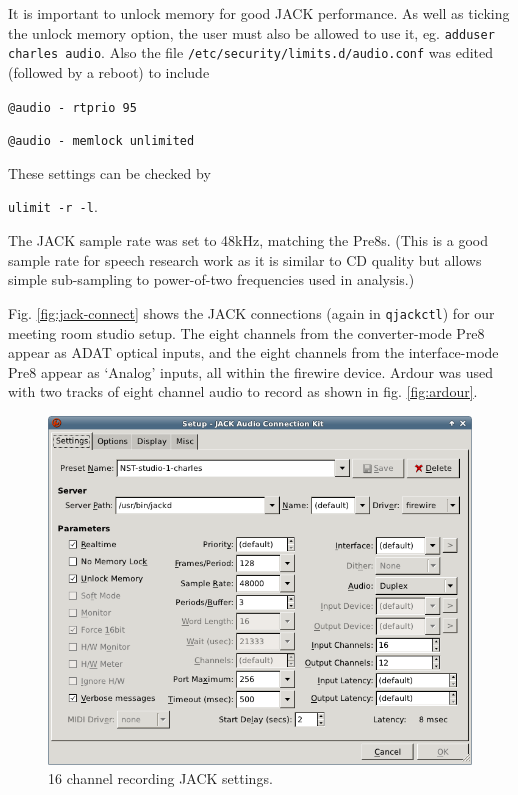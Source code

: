 \documentclass[oneside,english]{scrbook}
\begin{document}
It is important to unlock memory for good JACK performance.  As well as ticking the unlock memory option, the user must also be allowed to use it, eg. {\tt adduser charles audio}.  Also the file {\tt /etc/security/limits.d/audio.conf} was edited (followed by a reboot) to include

{\tt @audio - rtprio 95 }

{\tt @audio - memlock unlimited }

These settings can be checked by

{\tt ulimit -r -l}.

The JACK sample rate was set to 48kHz, matching the Pre8s.  (This is a good sample rate for speech research work as it is similar to CD quality but allows simple sub-sampling to power-of-two frequencies used in analysis.)

Fig. \ref{fig:jack-connect} shows the JACK connections (again in {\tt qjackctl}) for our meeting room studio setup.  The eight channels from the converter-mode Pre8 appear as ADAT optical inputs, and the eight channels from the interface-mode Pre8 appear as `Analog' inputs, all within the firewire device.  Ardour was used with two tracks of eight channel audio to record as shown in fig. \ref{fig:ardour}.



\begin{figure}
  \centering
  \includegraphics[width=\columnwidth]{figs/jack-settings.png}
  \caption{16 channel recording JACK settings.}
  \label{fig:jack-settings}
\end{figure}
\end{document}
